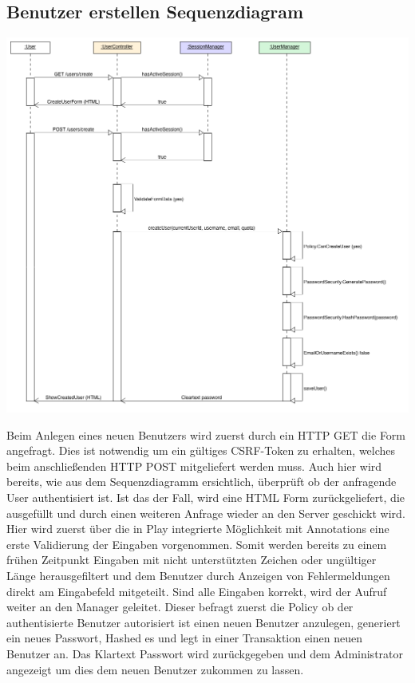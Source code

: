 \documentclass[12pt,DIV14,BCOR10mm,a4paper,twoside,parskip=half-,headsepline,headinclude,english,ngerman,bibliography=totocnumbered]{scrreprt}
\begin{document}
\subsection{Benutzer erstellen Sequenzdiagram}

\includegraphics[width=0.7\paperwidth]{resources/createuserseq_diagram.png}

Beim Anlegen eines neuen Benutzers wird zuerst durch ein HTTP GET die Form angefragt. Dies ist notwendig um ein gültiges CSRF-Token zu erhalten, welches beim anschließenden HTTP POST mitgeliefert werden muss. Auch hier wird bereits, wie aus dem Sequenzdiagramm ersichtlich, überprüft ob der anfragende User authentisiert ist. Ist das der Fall, wird eine HTML Form zurückgeliefert, die ausgefüllt und durch einen weiteren Anfrage wieder an den Server geschickt wird. Hier wird zuerst über die in Play integrierte Möglichkeit mit Annotations eine erste Validierung der Eingaben vorgenommen. Somit werden bereits zu einem frühen Zeitpunkt Eingaben mit nicht unterstützten Zeichen oder ungültiger Länge herausgefiltert und dem Benutzer durch Anzeigen von Fehlermeldungen direkt am Eingabefeld mitgeteilt. Sind alle Eingaben korrekt, wird der Aufruf weiter an den Manager geleitet. Dieser befragt zuerst die Policy ob der authentisierte Benutzer autorisiert ist einen neuen Benutzer anzulegen, generiert ein neues Passwort, Hashed es und legt in einer Transaktion einen neuen Benutzer an. Das Klartext Passwort wird zurückgegeben und dem Administrator angezeigt um dies dem neuen Benutzer zukommen zu lassen.
\end{document}
